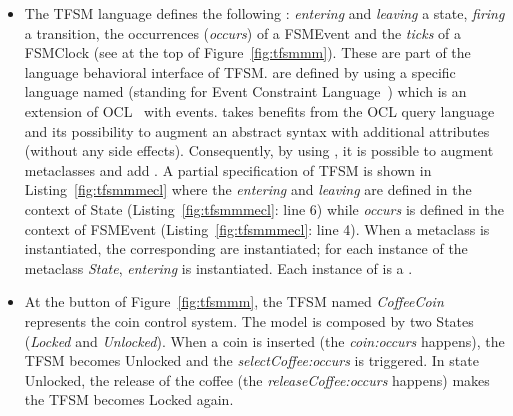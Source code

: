 \begin{itemize}
	\item The TFSM language defines the following \dse: \emph{entering} and \emph{leaving} a state, \emph{firing} a transition, the occurrences (\emph{occurs}) of a FSMEvent and the \emph{ticks} of a FSMClock (see at the top of Figure~\ref{fig:tfsmmm}). These \dse are part of the language behavioral interface of TFSM. \dse are defined by using a specific language named \ecl (standing for Event Constraint Language~\cite{eclbib}) which is an extension of OCL~\cite{omgocl2bib} with events. \ecl takes benefits from the OCL query language and its possibility to augment an abstract syntax with additional attributes (without any side effects). Consequently, by using \ecl, it is possible to augment \as metaclasses and add \dse. A partial \ecl specification of TFSM is shown in Listing~\ref{fig:tfsmmmecl} where the \dse \textit{entering} and \textit{leaving} are defined in the context of State (Listing~\ref{fig:tfsmmmecl}: line 6) while \textit{occurs} is defined in the context of FSMEvent (Listing~\ref{fig:tfsmmmecl}: line 4). When a metaclass is instantiated, the corresponding \dse are instantiated; \eg for each instance of the metaclass \emph{State}, \dse \textit{entering} is instantiated. Each instance of \dse is a \mse. 
	
	\item At the button of Figure~\ref{fig:tfsmmm}, the TFSM named \emph{CoffeeCoin} represents the coin control system. The model is composed by two States (\emph{Locked} and \emph{Unlocked}). When a coin is inserted (the \mse \emph{coin:occurs} happens), the TFSM becomes Unlocked and the \mse \emph{selectCoffee:occurs} is triggered. In state Unlocked, the release of the coffee (the \mse \emph{releaseCoffee:occurs} happens) makes the TFSM becomes Locked again.   
	

\end{itemize}
